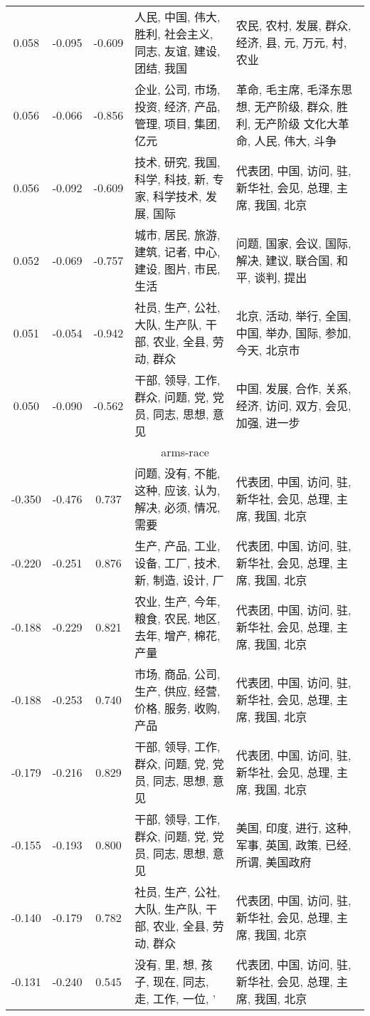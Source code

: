 \begin{tabular}{cccp{5cm}p{5cm}}
0.058 & -0.095 & -0.609 & 人民, 中国, 伟大, 胜利, 社会主义, 同志, 友谊, 建设, 团结, 我国 & 农民, 农村, 发展, 群众, 经济, 县, 元, 万元, 村, 农业 \\
0.056 & -0.066 & -0.856 & 企业, 公司, 市场, 投资, 经济, 产品, 管理, 项目, 集团, 亿元 & 革命, 毛主席, 毛泽东思想, 无产阶级, 群众, 胜利, 无产阶级 文化大革命, 人民, 伟大, 斗争 \\
0.056 & -0.092 & -0.609 & 技术, 研究, 我国, 科学, 科技, 新, 专家, 科学技术, 发展, 国际 & 代表团, 中国, 访问, 驻, 新华社, 会见, 总理, 主席, 我国, 北京 \\
0.052 & -0.069 & -0.757 & 城市, 居民, 旅游, 建筑, 记者, 中心, 建设, 图片, 市民, 生活 & 问题, 国家, 会议, 国际, 解决, 建议, 联合国, 和平, 谈判, 提出 \\
0.051 & -0.054 & -0.942 & 社员, 生产, 公社, 大队, 生产队, 干部, 农业, 全县, 劳动, 群众 & 北京, 活动, 举行, 全国, 中国, 举办, 国际, 参加, 今天, 北京市 \\
0.050 & -0.090 & -0.562 & 干部, 领导, 工作, 群众, 问题, 党, 党员, 同志, 思想, 意见 & 中国, 发展, 合作, 关系, 经济, 访问, 双方, 会见, 加强, 进一步 \\
\midrule
\multicolumn{5}{c}{arms-race}\\
-0.350 & -0.476 & 0.737 & 问题, 没有, 不能, 这种, 应该, 认为, 解决, 必须, 情况, 需要 & 代表团, 中国, 访问, 驻, 新华社, 会见, 总理, 主席, 我国, 北京 \\
-0.220 & -0.251 & 0.876 & 生产, 产品, 工业, 设备, 工厂, 技术, 新, 制造, 设计, 厂 & 代表团, 中国, 访问, 驻, 新华社, 会见, 总理, 主席, 我国, 北京 \\
-0.188 & -0.229 & 0.821 & 农业, 生产, 今年, 粮食, 农民, 地区, 去年, 增产, 棉花, 产量 & 代表团, 中国, 访问, 驻, 新华社, 会见, 总理, 主席, 我国, 北京 \\
-0.188 & -0.253 & 0.740 & 市场, 商品, 公司, 生产, 供应, 经营, 价格, 服务, 收购, 产品 & 代表团, 中国, 访问, 驻, 新华社, 会见, 总理, 主席, 我国, 北京 \\
-0.179 & -0.216 & 0.829 & 干部, 领导, 工作, 群众, 问题, 党, 党员, 同志, 思想, 意见 & 代表团, 中国, 访问, 驻, 新华社, 会见, 总理, 主席, 我国, 北京 \\
-0.155 & -0.193 & 0.800 & 干部, 领导, 工作, 群众, 问题, 党, 党员, 同志, 思想, 意见 & 美国, 印度, 进行, 这种, 军事, 英国, 政策, 已经, 所谓, 美国政府 \\
-0.140 & -0.179 & 0.782 & 社员, 生产, 公社, 大队, 生产队, 干部, 农业, 全县, 劳动, 群众 & 代表团, 中国, 访问, 驻, 新华社, 会见, 总理, 主席, 我国, 北京 \\
-0.131 & -0.240 & 0.545 & 没有, 里, 想, 孩子, 现在, 同志, 走, 工作, 一位, ’ & 代表团, 中国, 访问, 驻, 新华社, 会见, 总理, 主席, 我国, 北京 \\

\end{tabular}

